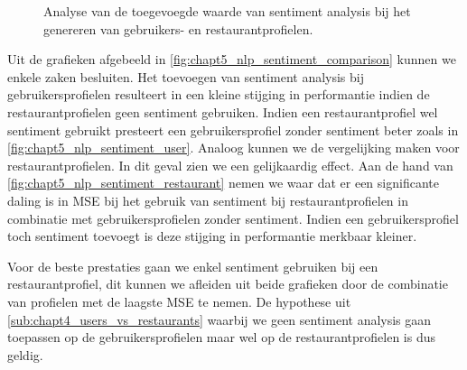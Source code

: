 \begin{figure}[H]
        \caption{Analyse van de toegevoegde waarde van sentiment analysis bij het genereren van gebruikers- en restaurantprofielen.}
        \label{fig:chapt5_nlp_sentiment_comparison}
\end{figure}

Uit de grafieken afgebeeld in \autoref{fig:chapt5_nlp_sentiment_comparison} kunnen we enkele zaken besluiten. Het toevoegen van sentiment analysis bij gebruikersprofielen resulteert in een kleine stijging in performantie indien de restaurantprofielen geen sentiment gebruiken. Indien een restaurantprofiel wel sentiment gebruikt presteert een gebruikersprofiel zonder sentiment beter zoals in \autoref{fig:chapt5_nlp_sentiment_user}. Analoog kunnen we de vergelijking maken voor restaurantprofielen. In dit geval zien we een gelijkaardig effect. Aan de hand van \autoref{fig:chapt5_nlp_sentiment_restaurant} nemen we waar dat er een significante daling is in MSE bij het gebruik van sentiment bij restaurantprofielen in combinatie met gebruikersprofielen zonder sentiment. Indien een gebruikersprofiel toch sentiment toevoegt is deze stijging in performantie merkbaar kleiner.

Voor de beste prestaties gaan we enkel sentiment gebruiken bij een restaurantprofiel, dit kunnen we afleiden uit beide grafieken door de combinatie van profielen met de laagste MSE te nemen. De hypothese uit \autoref{sub:chapt4_users_vs_restaurants} waarbij we geen sentiment analysis gaan toepassen op de gebruikersprofielen maar wel op de restaurantprofielen is dus geldig. \\

